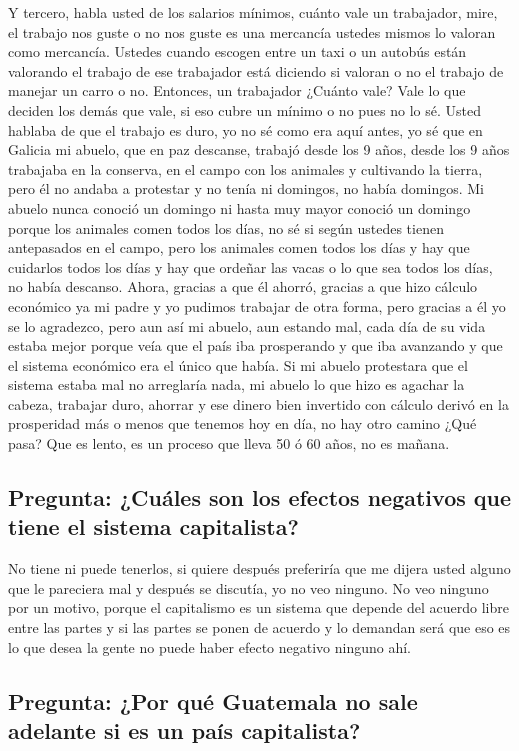 Y tercero, habla usted de los salarios mínimos, cuánto vale un trabajador, mire, el trabajo nos guste o no nos guste es una mercancía ustedes mismos lo valoran como mercancía. Ustedes cuando escogen entre un taxi o un autobús están valorando el trabajo de ese trabajador está diciendo si valoran o no el trabajo de manejar un carro o no. Entonces, un trabajador ¿Cuánto vale? Vale lo que deciden los demás que vale, si eso cubre un mínimo o no pues no lo sé. Usted hablaba de que el trabajo es duro, yo no sé como era aquí antes, yo sé que en Galicia mi abuelo, que en paz descanse, trabajó desde los 9 años, desde los 9 años trabajaba en la conserva, en el campo con los animales y cultivando la tierra, pero él no andaba a protestar y no tenía ni domingos, no había domingos. Mi abuelo nunca conoció un domingo ni hasta muy mayor conoció un domingo porque los animales comen todos los días, no sé si según ustedes tienen antepasados en el campo, pero los animales comen todos los días y hay que cuidarlos todos los días y hay que ordeñar las vacas o lo que sea todos los días, no había descanso. Ahora, gracias a que él ahorró, gracias a que hizo cálculo económico ya mi padre y yo pudimos trabajar de otra forma, pero gracias a él yo se lo agradezco, pero aun así mi abuelo, aun estando mal, cada día de su vida estaba mejor porque veía que el país iba prosperando y que iba avanzando y que el sistema económico era el único que había. Si mi abuelo protestara que el sistema estaba mal no arreglaría nada, mi abuelo lo que hizo es agachar la cabeza, trabajar duro, ahorrar y ese dinero bien invertido con cálculo derivó en la prosperidad más o menos que tenemos hoy en día, no hay otro camino ¿Qué pasa? Que es lento, es un proceso que lleva 50 ó 60 años, no es mañana.

\subsection{Pregunta: ¿Cuáles son los efectos negativos que tiene el sistema capitalista?}

No tiene ni puede tenerlos, si quiere después preferiría que me dijera usted alguno que le pareciera mal y después se discutía, yo no veo ninguno. No veo ninguno por un motivo, porque el capitalismo es un sistema que depende del acuerdo libre entre las partes y si las partes se ponen de acuerdo y lo demandan será que eso es lo que desea la gente no puede haber efecto negativo ninguno ahí.

\subsection{Pregunta: ¿Por qué Guatemala no sale adelante si es un país capitalista?}

